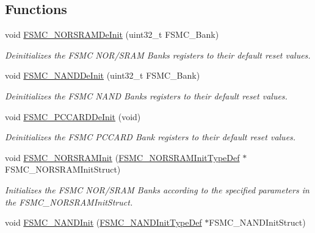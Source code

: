 \subsection*{Functions}
\begin{DoxyCompactItemize}
\item 
void \hyperlink{group___f_s_m_c___exported___functions_gaab3e6648e8a584e73785361ac960eded}{F\+S\+M\+C\+\_\+\+N\+O\+R\+S\+R\+A\+M\+De\+Init} (uint32\+\_\+t F\+S\+M\+C\+\_\+\+Bank)
\begin{DoxyCompactList}\small\item\em Deinitializes the F\+S\+MC N\+O\+R/\+S\+R\+AM Banks registers to their default reset values. \end{DoxyCompactList}\item 
void \hyperlink{group___f_s_m_c___exported___functions_gafb749503293474a68555961bd8f120e1}{F\+S\+M\+C\+\_\+\+N\+A\+N\+D\+De\+Init} (uint32\+\_\+t F\+S\+M\+C\+\_\+\+Bank)
\begin{DoxyCompactList}\small\item\em Deinitializes the F\+S\+MC N\+A\+ND Banks registers to their default reset values. \end{DoxyCompactList}\item 
void \hyperlink{group___f_s_m_c___exported___functions_ga2f53ccf3a4f3c80a5a56fb47ccd47ccd}{F\+S\+M\+C\+\_\+\+P\+C\+C\+A\+R\+D\+De\+Init} (void)
\begin{DoxyCompactList}\small\item\em Deinitializes the F\+S\+MC P\+C\+C\+A\+RD Bank registers to their default reset values. \end{DoxyCompactList}\item 
void \hyperlink{group___f_s_m_c___exported___functions_ga9c27816e8b17394c9ee1ce9298917b4a}{F\+S\+M\+C\+\_\+\+N\+O\+R\+S\+R\+A\+M\+Init} (\hyperlink{struct_f_s_m_c___n_o_r_s_r_a_m_init_type_def}{F\+S\+M\+C\+\_\+\+N\+O\+R\+S\+R\+A\+M\+Init\+Type\+Def} $\ast$F\+S\+M\+C\+\_\+\+N\+O\+R\+S\+R\+A\+M\+Init\+Struct)
\begin{DoxyCompactList}\small\item\em Initializes the F\+S\+MC N\+O\+R/\+S\+R\+AM Banks according to the specified parameters in the F\+S\+M\+C\+\_\+\+N\+O\+R\+S\+R\+A\+M\+Init\+Struct. \end{DoxyCompactList}\item 
void \hyperlink{group___f_s_m_c___exported___functions_ga9f81ccc4e126c11f1eb33077b1a68e6f}{F\+S\+M\+C\+\_\+\+N\+A\+N\+D\+Init} (\hyperlink{struct_f_s_m_c___n_a_n_d_init_type_def}{F\+S\+M\+C\+\_\+\+N\+A\+N\+D\+Init\+Type\+Def} $\ast$F\+S\+M\+C\+\_\+\+N\+A\+N\+D\+Init\+Struct)

\end{DoxyCompactItemize}
